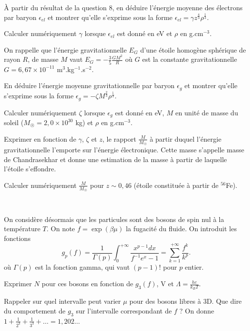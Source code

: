 \documentclass[utf8, 11pt]{feuille}
\begin{document}
\question \`A partir du résultat de la question 8, en déduire l'énergie moyenne des électrons par baryon $\epsilon_{el}$ et montrer qu'elle s'exprime sous la forme $\epsilon_{el}=\gamma z^{\frac{4}{3}} \rho^{\frac{1}{3}}$. 

\question Calculer numériquement $\gamma$ lorsque $\epsilon_{el}$ est donné en eV et $\rho$ en g.cm$^{-3}$.

On rappelle que l'énergie gravitationnelle $E_G$ d'une étoile homogène sphérique de rayon $R$, de masse $M$ vaut $E_G=-\frac{3}{5}\frac{GM^2}{R}$ où $G$ est la constante gravitationnelle $G=6,67 \times 10^{-11}$  m$^3$.kg$^{-1}$.s$^{-2}$. 

\question En déduire l'énergie moyenne gravitationnelle par baryon $\epsilon_{g}$ et montrer qu'elle s'exprime sous la forme $\epsilon_{g}=-\zeta M^{\frac{2}{3}} \rho^{\frac{1}{3}}$.

\question Calculer numériquement $\zeta$ lorsque $\epsilon_{g}$ est donné en eV, $M$ en unité de masse du soleil ($M_{\astrosun}=2,0 \times 10^{30}$ kg) et  $\rho$ en g.cm$^{-3}$.

\question Exprimer  en fonction de $\gamma$, $\zeta$ et $z$, le rapport $\frac{M}{M_{\astrosun}}$ à partir duquel l'énergie gravitationnelle l'emporte sur l'énergie électronique. Cette masse s'appelle masse de Chandrasekhar et donne une estimation de la masse à partir de laquelle  l'étoile s'effondre.

\question Calculer numériquement $\frac{M}{M_{\astrosun}}$ pour $z \sim 0,46$ (étoile constituée à partir de $^{56}$Fe).

\ 

On considère désormais que les particules sont des bosons de spin nul à la température $T$.
On note $f=\exp(\beta \mu)$ la fugacité du fluide. On introduit les fonctions 
\begin{equation*}
    g_p(f)=\frac{1}{\Gamma (p)} \int_0^{+\infty}\frac{x^{p-1} dx}{f^{-1}e^x-1}=\sum_{k=1}^{+\infty} \frac{f^k}{k^p}.
\end{equation*}
où $\Gamma (p)$ est la fonction gamma, qui vaut $(p-1)!$ pour $p$ entier.

\question Exprimer $N$ pour ces bosons en fonction de $g_3(f)$, V et $\Lambda=\frac{hc}{k_BT}$. 

\question Rappeler sur quel intervalle peut varier $\mu$ pour des bosons libres à 3D. Que dire du comportement de $g_3$ sur l'intervalle correspondant de $f$ ?  On donne $1+\frac{1}{2^3}+\frac{1}{3^3}+ \ldots =1,202\dots$
\end{document}
